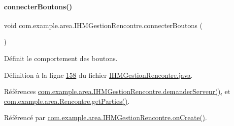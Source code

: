 \paragraph{\texorpdfstring{connecter\+Boutons()}{connecterBoutons()}}
{\footnotesize\ttfamily void com.\+example.\+area.\+I\+H\+M\+Gestion\+Rencontre.\+connecter\+Boutons (\begin{DoxyParamCaption}{ }\end{DoxyParamCaption})\hspace{0.3cm}{\ttfamily [private]}}



Définit le comportement des boutons. 



Définition à la ligne \hyperlink{_i_h_m_gestion_rencontre_8java_source_l00158}{158} du fichier \hyperlink{_i_h_m_gestion_rencontre_8java_source}{I\+H\+M\+Gestion\+Rencontre.\+java}.



Références \hyperlink{_i_h_m_gestion_rencontre_8java_source_l00222}{com.\+example.\+area.\+I\+H\+M\+Gestion\+Rencontre.\+demander\+Serveur()}, et \hyperlink{_rencontre_8java_source_l00158}{com.\+example.\+area.\+Rencontre.\+get\+Parties()}.



Référencé par \hyperlink{_i_h_m_gestion_rencontre_8java_source_l00064}{com.\+example.\+area.\+I\+H\+M\+Gestion\+Rencontre.\+on\+Create()}.


